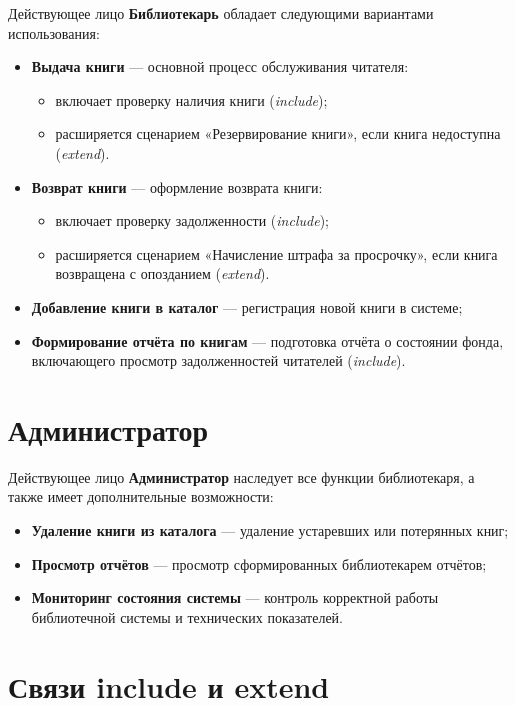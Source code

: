 \documentclass[a4paper,12pt]{article}
\begin{document}
Действующее лицо \textbf{Библиотекарь} обладает следующими вариантами использования:
\begin{itemize}[noitemsep]
    \item \textbf{Выдача книги} — основной процесс обслуживания читателя:
        \begin{itemize}
            \item включает проверку наличия книги (\textit{include});
            \item расширяется сценарием «Резервирование книги», если книга недоступна (\textit{extend}).
        \end{itemize}
    \item \textbf{Возврат книги} — оформление возврата книги:
        \begin{itemize}
            \item включает проверку задолженности (\textit{include});
            \item расширяется сценарием «Начисление штрафа за просрочку», если книга возвращена с опозданием (\textit{extend}).
        \end{itemize}
    \item \textbf{Добавление книги в каталог} — регистрация новой книги в системе;
    \item \textbf{Формирование отчёта по книгам} — подготовка отчёта о состоянии фонда, включающего просмотр задолженностей читателей (\textit{include}).
\end{itemize}

\section{Администратор}

Действующее лицо \textbf{Администратор} наследует все функции библиотекаря, а также имеет дополнительные возможности:
\begin{itemize}[noitemsep]
    \item \textbf{Удаление книги из каталога} — удаление устаревших или потерянных книг;
    \item \textbf{Просмотр отчётов} — просмотр сформированных библиотекарем отчётов;
    \item \textbf{Мониторинг состояния системы} — контроль корректной работы библиотечной системы и технических показателей.
\end{itemize}

\section{Связи include и extend}
\end{document}
